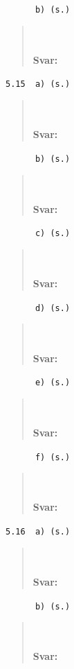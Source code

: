 \documentclass[a4paper]{article}
\newcommand{\tskcol}[1]{\textcolor{tskcol}{#1}}
\begin{document}
	\texttt{\tskcol{~~~~~~b) (s.)}}
	\begin{quotation}
		\noindent
		\\ \\
		\textbf{Svar:}
	\end{quotation}
	
	\texttt{\tskcol{5.15~~a) (s.)}}
	\begin{quotation}
		\noindent
		\\ \\
		\textbf{Svar:}
	\end{quotation}
	
	\texttt{\tskcol{~~~~~~b) (s.)}}
	\begin{quotation}
		\noindent
		\\ \\
		\textbf{Svar:}
	\end{quotation}
	
	\texttt{\tskcol{~~~~~~c) (s.)}}
	\begin{quotation}
		\noindent
		\\ \\
		\textbf{Svar:}
	\end{quotation}
	
	\texttt{\tskcol{~~~~~~d) (s.)}}
	\begin{quotation}
		\noindent
		\\ \\
		\textbf{Svar:}
	\end{quotation}
	
	\texttt{\tskcol{~~~~~~e) (s.)}}
	\begin{quotation}
		\noindent
		\\ \\
		\textbf{Svar:}
	\end{quotation}
	
	\texttt{\tskcol{~~~~~~f) (s.)}}
	\begin{quotation}
		\noindent
		\\ \\
		\textbf{Svar:}
	\end{quotation}
	
	\texttt{\tskcol{5.16~~a) (s.)}}
	\begin{quotation}
		\noindent
		\\ \\
		\textbf{Svar:}
	\end{quotation}
	
	\texttt{\tskcol{~~~~~~b) (s.)}}
	\begin{quotation}
		\noindent
		\\ \\
		\textbf{Svar:}
	\end{quotation}
	
\end{document}
